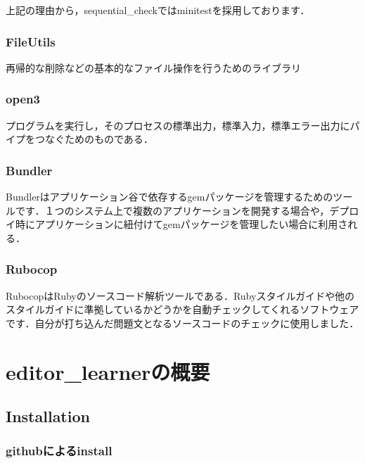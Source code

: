 \documentclass[11pt,dvipdfmx]{jsarticle}
\begin{document}
上記の理由から，sequential\_checkではminitestを採用しております．

    \subsubsection{FileUtils}\label{fileutils}

    再帰的な削除などの基本的なファイル操作を行うためのライブラリ

    \subsubsection{open3}\label{open3}

    プログラムを実行し，そのプロセスの標準出力，標準入力，標準エラー出力にパイプをつなぐためのものである．

    \subsubsection{Bundler}\label{bundler}

Bundlerはアプリケーション谷で依存するgemパッケージを管理するためのツールです．１つのシステム上で複数のアプリケーションを開発する場合や，デプロイ時にアプリケーションに紐付けてgemパッケージを管理したい場合に利用される．

    \subsubsection{Rubocop}\label{rubocop}

RubocopはRubyのソースコード解析ツールである．Rubyスタイルガイドや他のスタイルガイドに準拠しているかどうかを自動チェックしてくれるソフトウェアです．自分が打ち込んだ問題文となるソースコードのチェックに使用しました．

    \section{editor\_learnerの概要}\label{editor_learnerux306eux6982ux8981}

    \subsection{Installation}\label{installation}

\subsubsection{githubによるinstall}\label{githubux306bux3088ux308binstall}
\end{document}
